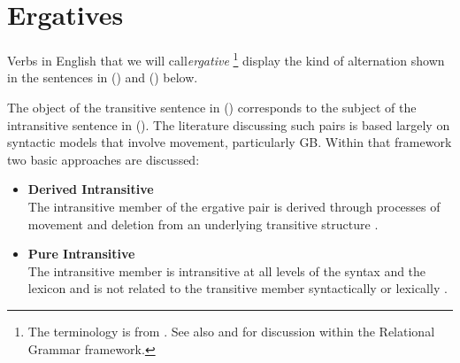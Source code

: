 \chapter{Ergatives}
\label{ergatives}

Verbs in English that we will call{\it ergative} \footnote {The terminology is
from \cite{Burzio86}. See also \cite{Perlmutter83} and \cite{Rosen81} for
discussion within the Relational Grammar framework.} display the kind of
alternation shown in the sentences in () and () below.


The object of the transitive sentence in () corresponds to the subject
of the intransitive sentence in (). The literature discussing such pairs
is based largely on syntactic models that involve movement, particularly GB.
Within that framework two basic approaches are discussed:

\begin{itemize}
\item {\bf Derived Intransitive}\\ The intransitive member of the
ergative pair is derived through processes of movement and deletion from an
underlying transitive structure \cite{Burzio86,HaleKeyser86,HaleKeyser87}.

\item {\bf Pure Intransitive}\\ The intransitive member is intransitive at all levels of the
syntax and the lexicon and is not related to the transitive member
syntactically or lexically \cite{Napoli88}.
\end{itemize}

